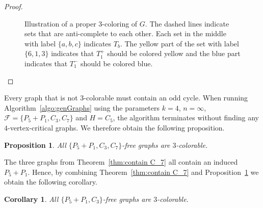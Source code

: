 \documentclass[11pt,a4paper]{article}
\newtheorem{proposition}[theorem]{Proposition}
\newtheorem{corollary}[theorem]{Corollary}
\theoremstyle{definition}
\begin{document}
\begin{proof}
\begin{figure}[h!]
{
}
    \caption{Illustration of a proper 3-coloring of $G$. The dashed lines indicate sets that are anti-complete to each other. Each set in the middle with label $\{a,b,c\}$ indicates $T_b$. The yellow part of the set with label $\{6,1,3\}$ indicates that $T_1^+$ should be colored yellow and the blue part indicates that $T_1^-$ should be colored blue.}
    \label{fig:placeholder}
\end{figure}
\end{proof}

Every graph that is not $3$-colorable must contain an odd cycle. When running Algorithm~\ref{algo:genGraphs} using the parameters $k=4$, $n=\infty$, $\mathcal{F}=\{P_5+P_1,C_3,C_7\}$ and $H=C_5$, the algorithm terminates without finding any $4$-vertex-critical graphs. We therefore obtain the following proposition.
\begin{proposition}
\label{prop:P5PlusP1C3C7Free}
All $\{P_5+P_1,C_3,C_7\}$-free graphs are $3$-colorable.
\end{proposition}

The three graphs from Theorem~\ref{thm:contain C_7} all contain an induced $P_5+P_1$. Hence, by combining Theorem~\ref{thm:contain C_7} and Proposition~\ref{prop:P5PlusP1C3C7Free} we obtain the following corollary.

\begin{corollary}
All $\{P_5+P_1,C_3\}$-free graphs are $3$-colorable.
\end{corollary}
\end{document}
